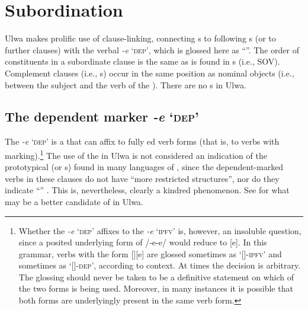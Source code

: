 \section{Subordination}\label{sec:12.2}


Ulwa makes prolific use of clause-linking, connecting s to following s (or to further  clauses) with the verbal  \textit{-e} ‘\textsc{dep}’, which is glossed here as “”. The order of constituents in a subordinate clause is the same as is found in s (i.e., SOV). Complement clauses (i.e., s) occur in the same position as nominal objects (i.e., between the subject and the verb of the ). There are no s in Ulwa.



\subsection{The dependent marker \textit{-e} ‘\textsc{dep}’}\label{sec:12.2.1}


The  \textit{-e} ‘\textsc{dep}’ is a  that can affix to fully ed verb forms (that is, to verbs with   marking).\footnote{Whether the  \textit{-e} ‘\textsc{dep}’ affixes to the   \textit{-e} ‘\textsc{ipfv}’ is, however, an insoluble question, since a posited underlying form of /-e-e/ would reduce to [e]. In this grammar, verbs with the form [][e] are glossed sometimes as ‘[]-\textsc{ipfv}’ and sometimes as ‘[]-\textsc{dep}’, according to context. At times the decision is arbitrary. The glossing should never be taken to be a definitive statement on which of the two  forms is being used. Moreover, in many instances it is possible that both forms are underlyingly present in the same verb form.} The use of the  in Ulwa is not considered an indication of the prototypical  (or s) found in many languages of , since the de\-pendent-marked verbs in these clauses do not have “more restricted structures”, nor do they indicate “” \citep[399]{Longacre2007}. This is, nevertheless, clearly a kindred phenomenon. See  for what may be a better candidate of  in Ulwa.

